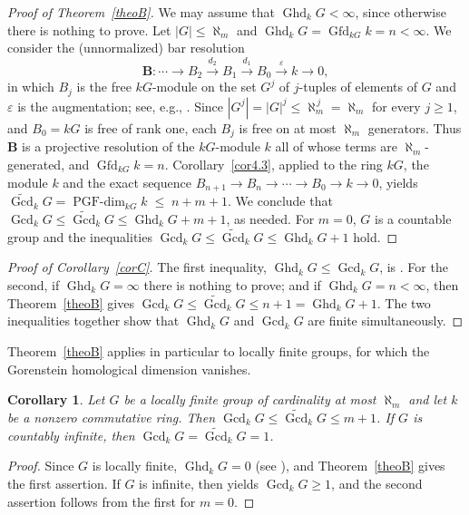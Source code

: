 \documentclass[12pt]{amsart}
\newtheorem{corollary}[theorem]{Corollary}
\theoremstyle{remark}
\theoremstyle{definition}
\theoremstyle{plain}
\DeclareMathOperator{\Ghd}{Ghd}
\DeclareMathOperator{\Gcd}{Gcd}
\DeclareMathOperator{\Gfd}{Gfd}
\newcommand{\PGFdim}{\operatorname{PGF\text{-}dim}}
\newcommand{\PGFcd}{\widetilde{\Gcd}}
\newcommand{\alephm}{\aleph_m}
\begin{document}
\begin{proof}[Proof of Theorem~\ref{theoB}]
We may assume that $\Ghd_kG<\infty$, since otherwise there is nothing to prove. Let $|G|\le\alephm$ and $\Ghd_kG=\Gfd_{kG}k=n<\infty$. We consider the (unnormalized) bar resolution $$\mathbf B:
\cdots\rightarrow B_2\xrightarrow{d_2}B_1\xrightarrow{d_1}B_0\xrightarrow{\varepsilon}k\rightarrow0,$$
in which $B_j$ is the free $kG$-module on the set $G^{j}$ of $j$-tuples of elements of $G$ and $\varepsilon$ is the augmentation; see, e.g., \cite[Chapter~I.5]{Brown}. Since $|G^j|=|G|^j\le\alephm^{\,j}=\alephm$ for every $j\ge1$, and $B_0=kG$ is free of rank one, each $B_j$ is free on at most $\alephm$ generators. Thus $\mathbf B$ is a projective resolution of the $kG$-module $k$ all of whose terms are $\alephm$-generated, and $\Gfd_{kG}k=n$. Corollary~\ref{cor4.3}, applied to the ring $kG$, the module $k$ and the exact sequence $B_{n+1}\to B_n\to\cdots\to B_0\to k\to0$, yields $\PGFcd_kG=\PGFdim_{kG}k\;\le\;n+m+1$. We conclude that $\Gcd_kG\le\PGFcd_kG\le\Ghd_kG+m+1$, as needed. For $m=0$, $G$ is a countable group and the inequalities $\Gcd_kG\le\PGFcd_kG\le\Ghd_kG+1$ hold.
\end{proof}

\begin{proof}[Proof of Corollary~\ref{corC}]
The first inequality, $\Ghd_kG\le\Gcd_kG$, is \cite[Theorem~3.10]{KS}. For the second, if $\Ghd_kG=\infty$ there is nothing to prove; and if $\Ghd_kG=n<\infty$, then Theorem~\ref{theoB} gives $\Gcd_kG\le\PGFcd_kG\le n+1=\Ghd_kG+1$. The two inequalities together show that $\Ghd_kG$ and $\Gcd_kG$ are finite simultaneously.
\end{proof}

Theorem~\ref{theoB} applies in particular to locally finite groups, for which the Gorenstein homological dimension vanishes.

\begin{corollary}\label{cor5.1}
Let $G$ be a locally finite group of cardinality at most $\alephm$ and let $k$ be a nonzero commutative ring. Then $\Gcd_kG\le\PGFcd_kG\le m+1$. If $G$ is countably infinite, then $\Gcd_kG=\PGFcd_kG=1$.
\end{corollary}

\begin{proof}
Since $G$ is locally finite, $\Ghd_kG=0$ (see \cite[Theorem~1.4]{KS}), and Theorem~\ref{theoB} gives the first assertion. If $G$ is infinite, then \cite[Corollary~2.3]{ET} yields $\Gcd_kG\ge1$, and the second assertion follows from the first for $m=0$.
\end{proof}
\end{document}
